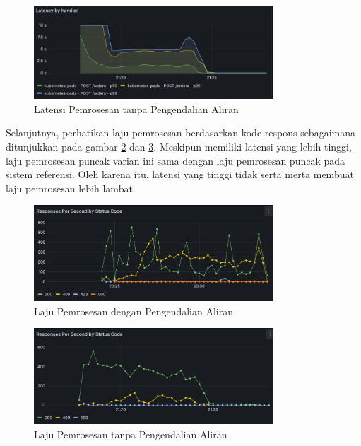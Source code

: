 \begin{figure}[htbp]
    \centering
    \includegraphics[width=0.8\textwidth]{resources/chapter-4/latency-nofc-pg-stress-0.png}
    \caption{Latensi Pemrosesan tanpa Pengendalian Aliran}
    \label{fig:latency-nofc}
\end{figure}

Selanjutnya, perhatikan laju pemrosesan berdasarkan kode respons sebagaimana ditunjukkan pada gambar \ref{fig:rps-fc-pg-stress-0} dan \ref{fig:rps-nofc-pg-stress-0}. Meskipun memiliki latensi yang lebih tinggi, laju pemrosesan puncak varian ini sama dengan laju pemrosesan puncak pada sistem referensi. Oleh karena itu, latensi yang tinggi tidak serta merta membuat laju pemrosesan lebih lambat.

\pagebreak

\begin{figure}[htbp]
    \centering
    \includegraphics[width=0.8\textwidth]{resources/chapter-4/rps-fc-pg-stress-0.png}
    \caption{Laju Pemrosesan dengan Pengendalian Aliran}
    \label{fig:rps-fc-pg-stress-0}
\end{figure}

\begin{figure}[htbp]
    \centering
    \includegraphics[width=0.8\textwidth]{resources/chapter-4/rps-nofc-pg-stress-0.png}
    \caption{Laju Pemrosesan tanpa Pengendalian Aliran}
    \label{fig:rps-nofc-pg-stress-0}
\end{figure}

